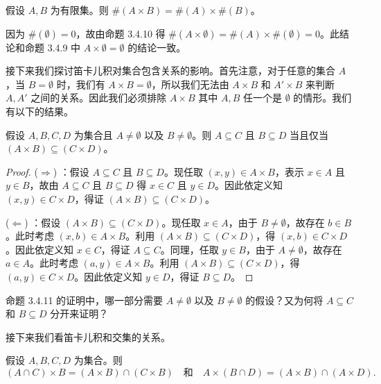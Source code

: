 \begin{proposition}
假设 $A, B$ 为有限集。则 $\#(A \times B) = \#(A) \times \#(B)$。
\end{proposition}

因为 $\#(\emptyset) = 0$，故由命题 3.4.10 得 $\#(A \times \emptyset) = \#(A) \times \#(\emptyset) = 0$。此结论和命题 3.4.9 中 $A \times \emptyset = \emptyset$ 的结论一致。

接下来我们探讨笛卡儿积对集合包含关系的影响。首先注意，对于任意的集合 $A$，当 $B = \emptyset$ 时，我们有 $A \times B = \emptyset$，所以我们无法由 $A \times B$ 和 $A' \times B$ 来判断 $A, A'$ 之间的关系。因此我们必须排除 $A \times B$ 其中 $A, B$ 任一个是 $\emptyset$ 的情形。我们有以下的结果。

\begin{proposition}
假设 $A, B, C, D$ 为集合且 $A \neq \emptyset$ 以及 $B \neq \emptyset$。则 $A \subseteq C$ 且 $B \subseteq D$ 当且仅当 $(A \times B) \subseteq (C \times D)$。
\end{proposition}

\begin{proof}
($\Rightarrow$) ：假设 $A \subseteq C$ 且 $B \subseteq D$。现任取 $(x, y) \in A \times B$，表示 $x \in A$ 且 $y \in B$，故由 $A \subseteq C$ 且 $B \subseteq D$ 得 $x \in C$ 且 $y \in D$。因此依定义知 $(x, y) \in C \times D$，得证 $(A \times B) \subseteq (C \times D)$。

($\Leftarrow$) ：假设 $(A \times B) \subseteq (C \times D)$。现任取 $x \in A$，由于 $B \neq \emptyset$，故存在 $b \in B$。此时考虑 $(x, b) \in A \times B$。利用 $(A \times B) \subseteq (C \times D)$，得 $(x, b) \in C \times D$。因此依定义知 $x \in C$，得证 $A \subseteq C$。同理，任取 $y \in B$，由于 $A \neq \emptyset$，故存在 $a \in A$。此时考虑 $(a, y) \in A \times B$。利用 $(A \times B) \subseteq (C \times D)$，得 $(a, y) \in C \times D$。因此依定义知 $y \in D$，得证 $B \subseteq D$。
\end{proof}

\begin{question}
命题 3.4.11 的证明中，哪一部分需要 $A \neq \emptyset$ 以及 $B \neq \emptyset$ 的假设？又为何将 $A \subseteq C$ 和 $B \subseteq D$ 分开来证明？
\end{question}

接下来我们看笛卡儿积和交集的关系。

\begin{proposition}
假设 $A, B, C, D$ 为集合。则
$$ (A \cap C) \times B = (A \times B) \cap (C \times B) \quad \text{和} \quad A \times (B \cap D) = (A \times B) \cap (A \times D). $$
\end{proposition}


